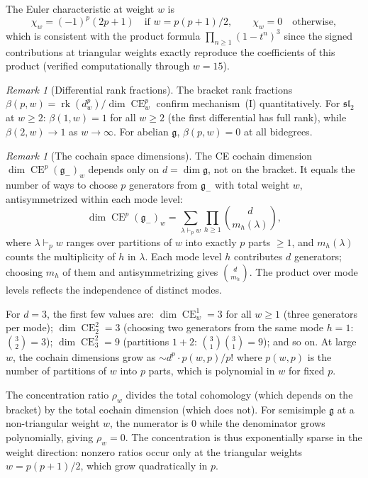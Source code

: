 \documentclass[11pt,reqno]{amsart}
\theoremstyle{plain}
\theoremstyle{definition}
\theoremstyle{remark}
\newtheorem{remark}[theorem]{Remark}
\DeclareMathOperator{\CE}{CE}
\DeclareMathOperator{\rk}{rk}
\newcommand{\fg}{\mathfrak{g}}
\newcommand{\gminus}{\fg_{-}}
\begin{document}
The Euler characteristic at weight $w$ is
\[
 \chi_w = (-1)^p (2p+1) \quad \text{if } w = p(p+1)/2, \qquad
 \chi_w = 0 \quad \text{otherwise},
\]
which is consistent with the product formula
$\prod_{n \ge 1}(1 - t^n)^3$ since the signed contributions at triangular
weights exactly reproduce the coefficients of this product (verified
computationally through $w = 15$).

\begin{remark}[Differential rank fractions]\label{rem:rank-fractions}
 The bracket rank fractions $\beta(p,w) = \rk(d^p_w)/\dim\CE^p_w$ confirm
 mechanism~(I) quantitatively. For $\mathfrak{sl}_2$ at $w \ge 2$:
 $\beta(1, w) = 1$ for all $w \ge 2$ (the first differential has full
 rank), while $\beta(2, w) \to 1$ as $w \to \infty$. For abelian $\fg$,
 $\beta(p, w) = 0$ at all bidegrees.
\end{remark}

\begin{remark}[The cochain space dimensions]\label{rem:cochain}
 The CE cochain dimension $\dim \CE^p(\gminus)_w$ depends only on $d =
 \dim\fg$, not on the bracket. It equals the number of ways to
 choose $p$ generators from $\gminus$ with total weight $w$,
 antisymmetrized within each mode level:
 \[
 \dim \CE^p(\gminus)_w = \sum_{\lambda \vdash_p w}
 \prod_{h \ge 1} \binom{d}{m_h(\lambda)},
 \]
 where $\lambda \vdash_p w$ ranges over partitions of $w$ into exactly $p$
 parts $\ge 1$, and $m_h(\lambda)$ counts the multiplicity of $h$ in
 $\lambda$. Each mode level $h$ contributes $d$ generators; choosing
 $m_h$ of them and antisymmetrizing gives $\binom{d}{m_h}$. The
 product over mode levels reflects the independence of distinct modes.

 For $d = 3$, the first few values are:
 $\dim \CE^1_w = 3$ for all $w \ge 1$ (three generators per mode);
 $\dim \CE^2_2 = 3$ (choosing two generators from the same mode $h = 1$:
 $\binom{3}{2} = 3$); $\dim \CE^2_3 = 9$ (partitions $1+2$:
 $\binom{3}{1}\binom{3}{1} = 9$); and so on. At large $w$, the
 cochain dimensions grow as $\sim d^p \cdot p(w,p)/p!$ where $p(w,p)$
 is the number of partitions of $w$ into $p$ parts, which is polynomial
 in $w$ for fixed $p$.

 The concentration ratio $\rho_w$ divides the total cohomology (which
 depends on the bracket) by the total cochain dimension (which does not).
 For semisimple $\fg$ at a non-triangular weight $w$, the numerator
 is $0$ while the denominator grows polynomially, giving $\rho_w = 0$.
 The concentration is thus exponentially sparse in the weight direction:
 nonzero ratios occur only at the triangular weights $w = p(p+1)/2$,
 which grow quadratically in $p$.
\end{remark}
\end{document}
